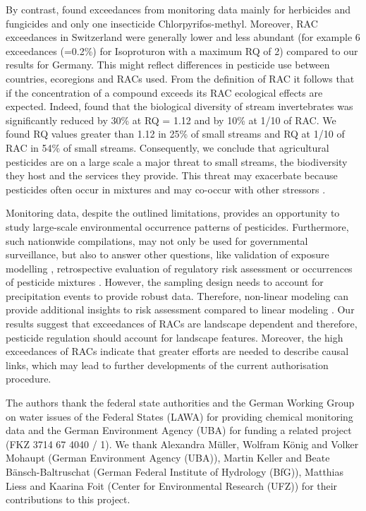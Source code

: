 \documentclass[journal=esthag,manuscript=article]{achemso}
\begin{document}
By contrast, \citet{knauer_pesticides_2016} found exceedances from monitoring data mainly for herbicides and fungicides and only one insecticide Chlorpyrifos-methyl.
Moreover, RAC exceedances in Switzerland were generally lower and less abundant (for example 6 exceedances (=0.2\%) for Isoproturon with a maximum RQ of 2) compared to our results for Germany. 
This might reflect differences in pesticide use between countries, ecoregions and RACs used. 
From the definition of RAC it follows that if the concentration of a compound exceeds its RAC ecological effects are expected.
Indeed, \citet{stehle_agricultural_2015} found that the biological diversity of stream invertebrates was significantly reduced by 30\% at RQ = 1.12 and by 10\% at 1/10 of RAC.
We found RQ values greater than 1.12 in 25\% of small streams and RQ at 1/10 of RAC in 54\% of small streams. 
Consequently, we conclude that agricultural pesticides are on a large scale a major threat to small streams, the biodiversity they host and the services they provide. 
This threat may exacerbate because pesticides often occur in mixtures \cite{schreiner_pesticide_2016} and may co-occur with other stressors \citep{schafer_contribution_2016}. 

Monitoring data, despite the outlined limitations, provides an opportunity to study large-scale environmental occurrence patterns of pesticides.
Furthermore, such nationwide compilations, may not only be used for governmental surveillance, but also to answer other questions, like validation of exposure modelling \cite{knabel_fungicide_2014}, retrospective evaluation of regulatory risk assessment \citep{knauer_pesticides_2016,stehle_pesticide_2015} or occurrences of pesticide mixtures \cite{schreiner_pesticide_2016}.
However, the sampling design needs to account for precipitation events to provide robust data. 
Therefore, non-linear modeling can provide additional insights to risk assessment compared to linear modeling \citep{fewster_analysis_2000}. 
Our results suggest that exceedances of RACs are landscape dependent and therefore, pesticide regulation should account for landscape features. 
Moreover, the high exceedances of RACs indicate that greater efforts are needed to describe causal links, which may lead to further developments of the current authorisation procedure.



\begin{acknowledgement}
The authors thank the federal state authorities and the German Working Group on water issues of the Federal States (LAWA) for providing chemical monitoring data and the German Environment Agency (UBA) for funding a related project (FKZ 3714 67 4040 / 1). 
We thank Alexandra Müller, Wolfram König and Volker Mohaupt (German Environment Agency (UBA)), Martin Keller and Beate Bänsch-Baltruschat (German Federal Institute of Hydrology (BfG)), Matthias Liess and Kaarina Foit (Center for Environmental Research (UFZ)) for their contributions to this project. 
\end{acknowledgement}
\end{document}
